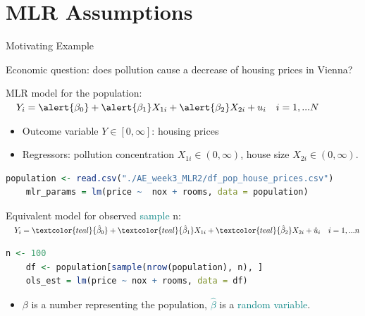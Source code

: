 \documentclass[11pt, aspectratio = 169]{beamer}
\begin{document}
\section{MLR Assumptions}

\begin{frame}[fragile]{Motivating Example}

Economic question: does pollution \alert{cause} a decrease of housing prices in Vienna?
 
\pause

MLR model for the \alert{population}:
$\quad Y_i = \alert{\beta_0} + \alert{\beta_1} X_{1i} + \alert{\beta_2} X_{2i} + u_{i} \quad i = 1, ... N$

\begin{itemize}
    \item Outcome variable $Y \in [0,\infty]$: housing prices
    \item Regressors: pollution concentration $X_{1i} \in (0,\infty)$, house size $X_{2i} \in (0,\infty)$.
\end{itemize}
\pause
\begin{lstlisting}[language=R]
    population <- read.csv("./AE_week3_MLR2/df_pop_house_prices.csv")
    mlr_params = lm(price ~  nox + rooms, data = population)
\end{lstlisting}

\pause
Equivalent model for observed \textcolor{teal}{sample} n:
$\quad Y_i = \textcolor{teal}{\hat{\beta}_0} + \textcolor{teal}{\hat{\beta}_1} X_{1i} + \textcolor{teal}{\hat{\beta}_2} X_{2i} + \hat{u}_{i} \quad i = 1, ... n$
\pause
\begin{lstlisting}[language=R]
    n <- 100
    df <- population[sample(nrow(population), n), ]
    ols_est = lm(price ~ nox + rooms, data = df)
\end{lstlisting}
\pause
\begin{itemize}
    \item[$\rightarrow$] \alert{$\beta$} is a \alert{number} representing the population, \textcolor{teal}{$\hat{\beta}$} is a \textcolor{teal}{random variable}.
\end{itemize}
\end{frame}
\end{document}
